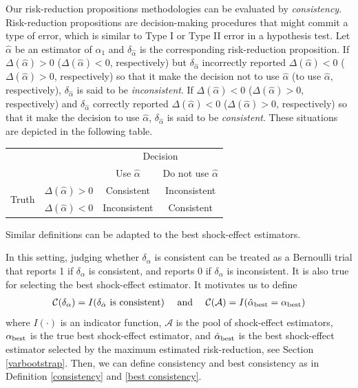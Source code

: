 \documentclass[11pt]{article}
\def\mc#1{\mathcal{#1}} %
\theoremstyle{definition}
\begin{document}
Our risk-reduction propositions methodologies can be evaluated by \emph{consistency}. Risk-reduction propositions are decision-making procedures that might commit a type of error, which is similar to Type I or Type II error in a hypothesis test. Let $\hat{\alpha}$ be an estimator of $\alpha_1$ and $\delta_{\hat{\alpha}}$ is the corresponding risk-reduction proposition. If $\Delta(\hat{\alpha})>0$ ($\Delta(\hat{\alpha})<0$, respectively) but $\delta_{\hat{\alpha}}$ incorrectly reported $\Delta(\hat{\alpha})<0$ ($\Delta(\hat{\alpha})>0$, respectively) so that it make the decision not to use $\hat{\alpha}$ (to use $\hat{\alpha}$, respectively), $\delta_{\hat{\alpha}}$ is said to be \emph{inconsistent}. If $\Delta(\hat{\alpha})<0$ ($\Delta(\hat{\alpha})>0$, respectively) and  $\delta_{\hat{\alpha}}$ correctly reported $\Delta(\hat{\alpha})<0$ ($\Delta(\hat{\alpha})>0$, respectively) so that it make the decision to use $\hat{\alpha}$, $\delta_{\hat{\alpha}}$ is said to be \emph{consistent}. These situations are depicted in the following table. 
\begin{center}
  \begin{center}
      \begin{tabular}{cc|c|c}
        \hline
        & & \multicolumn{2}{c}{Decision} \\
        & & Use $\hat{\alpha}$ & Do not use $\hat{\alpha}$ \\ 
                \hline
     \multirow{2}{*}{Truth}  & $\Delta(\hat{\alpha})>0$ & Consistent & Inconsistent\\
      \cline{3-4}
      & $\Delta(\hat{\alpha})<0$  & Inconsistent & Consistent \\
      \hline
      \end{tabular}
  \end{center}
\end{center}
Similar definitions can be adapted to the best shock-effect estimators. 

In this setting, judging whether $\delta_{\alpha}$ is consistent can be treated as a Bernoulli trial that reports 1 if $\delta_{\alpha}$ is consistent, and reports 0 if $\delta_{\alpha}$ is inconsistent. It is also true for selecting the best shock-effect estimator. It motivates us to define
\begin{align*}
	\mc{C}(\delta_{\alpha}) 
	= I(\delta_{\hat{\alpha}} \text{ is consistent})
 \quad \text{ and } \quad  	
 \mc{C}(\mc{A}) 
	= I(\hat{\alpha}_{\rm best} = \alpha_{\rm best})
\end{align*}
where $I(\cdot)$ is an indicator function, $\mc{A}$ is the pool of shock-effect estimators, $\alpha_{\rm best}$ is the true best shock-effect estimator, and $\hat{\alpha}_{\rm best}$ is the best shock-effect estimator selected by the maximum estimated risk-reduction,   see Section \ref{varbootstrap}.  Then, we can define consistency and best consistency as in Definition \ref{consistency} and \ref{best consistency}.
\end{document}

